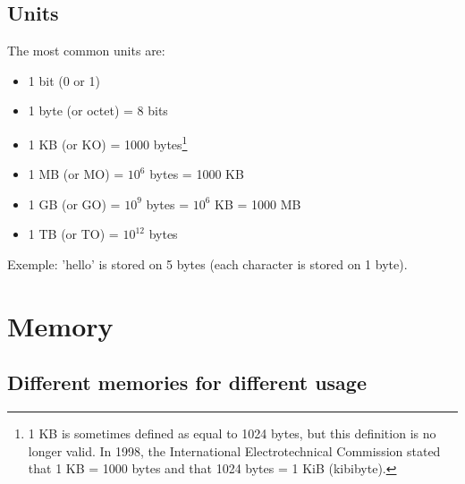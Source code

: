 \documentclass{beamer}[10pt, usepdftitle=false, handout]
\begin{document}
	\subsection{Units}	

    \begin{frame}
    
	The most common units are: 
	\begin{itemize}
		\item{1 bit (0 or 1)}
		\item{1 byte (or octet) = 8 bits}
		\item{1 KB (or KO) = 1000 bytes\footnote{1 KB is sometimes defined as equal to 1024 bytes, but this definition is no longer valid. In 1998, the International Electrotechnical Commission stated that 1 KB = 1000 bytes and that 1024 bytes = 1 KiB (kibibyte).}}
		\item{1 MB (or MO) = $10^6$ bytes = 1000 KB}
		\item{1 GB (or GO) = $10^9$ bytes = $10^6$ KB = 1000 MB}
		\item{1 TB (or TO) = $10^{12}$ bytes}
	\end{itemize}	 
    
   	Exemple: 'hello' is stored on 5 bytes (each character is stored on 1 byte).
            
	\end{frame}    
    
   	    
	\section{Memory}
	\subsection{Different memories for different usage}
	
\end{document}
